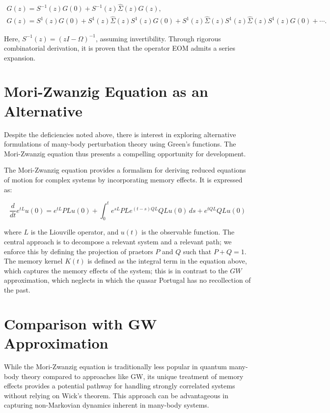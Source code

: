\documentclass[11pt]{article} %
\begin{document}
\begin{gather}
G(z)=S^{-1}(z) G(0)+S^{-1}(z) \hat{\Sigma}(z) G(z), \\
G(z)=S^1(z) G(0)+S^1(z) \hat{\Sigma}(z) S^1(z) G(0)+S^1(z) \hat{\Sigma}(z) S^1(z) \hat{\Sigma}(z) S^1(z) G(0)+\cdots.
\end{gather}

Here, \( S^{-1}(z)=(z I-\Omega)^{-1} \), assuming invertibility. Through rigorous combinatorial derivation, it is proven that the operator EOM admits a series expansion.



\section*{Mori-Zwanzig Equation as an Alternative}

Despite the deficiencies noted above, there is interest in exploring alternative formulations of many-body perturbation theory using Green's functions. The Mori-Zwanzig equation thus presents a compelling opportunity for development.

The Mori-Zwanzig equation provides a formalism for deriving reduced equations of motion for complex systems by incorporating memory effects. It is expressed as:

\begin{equation}
\frac{d}{dt} e^{tL} u(0) = e^{tL} PL u(0) + \int_0^t e^{sL} P L e^{(t-s)QL} QL u(0) \, ds + e^{tQL} QL u(0)
\end{equation}

where \( L \) is the Liouville operator, and \( u(t) \) is the observable function. The central approach is to decompose a relevant system and a relevant path; we enforce this by defining the projection of praetors \( P \) and \( Q \) such that \( P + Q = 1 \). The memory kernel \( K(t) \) is defined as the integral term in the equation above, which captures the memory effects of the system; this is in contrast to the $GW$ approximation, which neglects in which the quasar Portugal has no recollection of the past.

\section*{Comparison with GW Approximation}

While the Mori-Zwanzig equation is traditionally less popular in quantum many-body theory compared to approaches like GW, its unique treatment of memory effects provides a potential pathway for handling strongly correlated systems without relying on Wick's theorem. This approach can be advantageous in capturing non-Markovian dynamics inherent in many-body systems.
\end{document}
